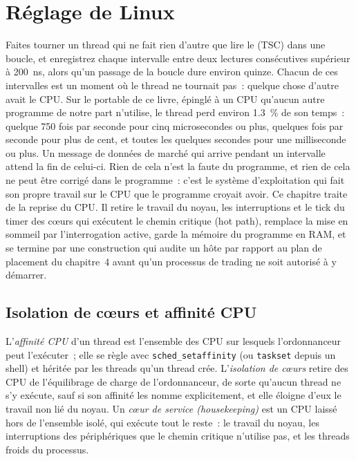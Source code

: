 \chapter{Réglage de Linux}\label{ch:ll:linux-tuning}

Faites tourner un thread qui ne fait rien d'autre que lire le  (TSC) dans une boucle, et enregistrez chaque intervalle entre deux
lectures consécutives supérieur à \qty{200}{\nano\second}, alors qu'un passage de la boucle dure environ quinze. Chacun de ces intervalles est un moment où
le thread ne tournait pas~: quelque chose d'autre avait le CPU. Sur le portable de ce livre, épinglé à un CPU qu'aucun autre programme
de notre part n'utilise, le thread perd environ 1.3~\% de son temps~: quelque 750 fois par seconde pour cinq microsecondes ou plus, quelques
fois par seconde pour plus de cent, et toutes les quelques secondes pour une milliseconde ou plus. Un message de données de marché
qui arrive pendant un intervalle attend la fin de celui-ci. Rien de cela n'est la faute du programme, et rien de cela ne peut être
corrigé dans le programme~: c'est le système d'exploitation qui fait son propre travail sur le CPU que le programme croyait avoir. Ce chapitre traite
de la reprise du CPU. Il retire le travail du noyau, les interruptions et le tick du timer des cœurs qui exécutent le
chemin critique (hot path), remplace la mise en sommeil par l'interrogation active, garde la mémoire du programme en RAM, et se termine par une construction qui audite un hôte par rapport au
plan de placement du chapitre~4 avant qu'un processus de trading ne soit autorisé à y démarrer.

\section{Isolation de cœurs et affinité CPU}

\begin{definition}\label{def:ll:linux-tuning:isolation}
L'\emph{affinité CPU} d'un thread est l'ensemble des CPU sur lesquels l'ordonnanceur peut l'exécuter~; elle se règle avec
\texttt{sched\_setaffinity} (ou
\texttt{taskset} depuis un shell) et héritée par les threads qu'un thread crée. L'\emph{isolation de cœurs} retire des CPU de l'équilibrage de charge de l'ordonnanceur, de sorte qu'aucun thread ne s'y exécute, sauf si son
affinité les nomme explicitement, et elle éloigne d'eux le travail non lié du noyau. Un \emph{cœur de service
(housekeeping)} est un CPU laissé hors de l'ensemble isolé, qui exécute tout le reste~: le travail du noyau, les
interruptions des périphériques que le chemin critique n'utilise pas, et les threads froids du processus.
\end{definition}

